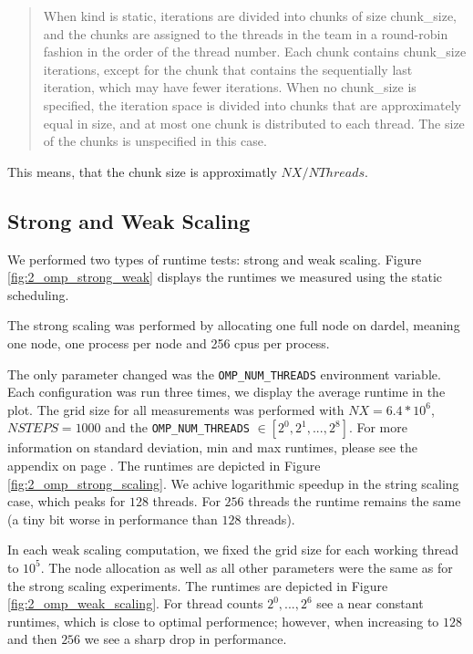\documentclass[a4paper,10pt]{article}
\begin{document}
\begin{multicols}{2}
\begin{quote}
When kind is static, iterations are divided into chunks of size chunk\_size, and the chunks are assigned to the threads in the team in a round-robin fashion in the order of the thread number. Each chunk contains chunk\_size iterations, except for the chunk that contains the sequentially last iteration, which may have fewer iterations.
When no chunk\_size is specified, the iteration space is divided into chunks that are approximately equal in size, and at most one chunk is distributed to each thread. The size of the chunks is unspecified in this case.
\end{quote}
This means, that the chunk size is approximatly $NX / NThreads$.
\subsection{Strong and Weak Scaling}

We performed two types of runtime tests: strong and weak scaling.
Figure \ref{fig:2_omp_strong_weak} displays the runtimes we measured using the static scheduling.

The strong scaling was performed by allocating one full node on dardel, meaning one node, one process per node
and 256 cpus per process.

The only parameter changed was the \verb|OMP_NUM_THREADS| environment variable.
Each configuration was run three times, we display the average runtime in the plot.
The grid size for all measurements was performed with $NX = 6.4 * 10^6$, $NSTEPS = 1000$ and the \verb|OMP_NUM_THREADS| $\in [2^0, 2^1, ..., 2^8]$.
For more information on standard deviation, min and max runtimes, please see the appendix on page \pageref{sec:app:statistics}.
The runtimes are depicted in Figure \ref{fig:2_omp_strong_scaling}.
We achive logarithmic speedup in the string scaling case, which peaks for $128$ threads.
For $256$ threads the runtime remains the same (a tiny bit worse in performance than $128$ threads).

In each weak scaling computation, we fixed the grid size for each working thread to $10^5$.
The node allocation as well as all other parameters were the same as for the strong scaling experiments.
The runtimes are depicted in Figure \ref{fig:2_omp_weak_scaling}.
For thread counts $2^0, ..., 2^6$ see a near constant runtimes, which is close to optimal performence; however, when increasing to $128$ and then $256$ we see a sharp drop in performance.


\end{multicols}
\end{document}
